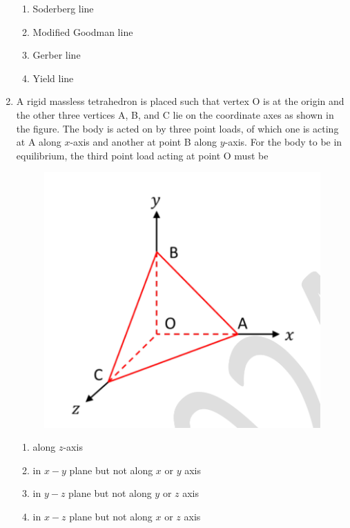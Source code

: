 \documentclass[journal,11pt,onecolumn]{IEEEtran}
\begin{document}
\begin{enumerate}[resume]
          \begin{enumerate}
              \item Soderberg line
              \item Modified Goodman line
              \item Gerber line
              \item Yield line
          \end{enumerate}

    \item A rigid massless tetrahedron is placed such that vertex O is at the origin and the other three vertices A, B, and C lie on the coordinate axes as shown in the figure. The body is acted on by three point loads, of which one is acting at A along $x$-axis and another at point B along $y$-axis. For the body to be in equilibrium, the third point load acting at point O must be

          \begin{figure}[H]
              \centering
              \includegraphics[scale=0.2]{q27}
              \caption{}
              \label{fig:q27}
          \end{figure}

          \begin{enumerate}
              \item along $z$-axis
              \item in $x-y$ plane but not along $x$ or $y$ axis
              \item in $y-z$ plane but not along $y$ or $z$ axis
              \item in $x-z$ plane but not along $x$ or $z$ axis
          \end{enumerate}


\end{enumerate}
\end{document}
